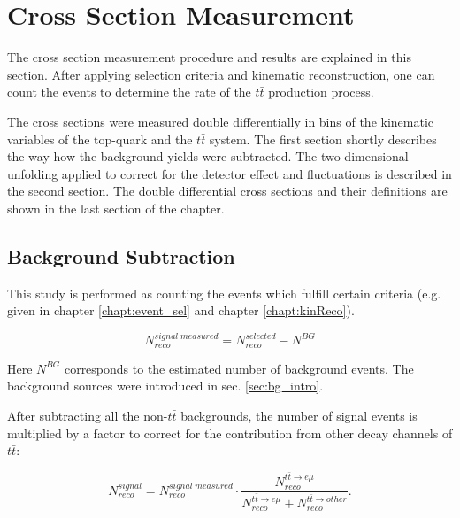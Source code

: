 \chapter{Cross Section Measurement}\label{chapt:xsec}

The cross section measurement procedure and results are explained in this section.
After applying selection criteria and kinematic reconstruction, one can count the events to determine
the rate of the $t\bar{t}$ production process.

The cross sections were measured double differentially in bins of the kinematic variables of the top-quark and the $t\bar{t}$ system.
The first section shortly describes the way how the background yields were subtracted.
The two dimensional unfolding applied to correct for the detector effect and fluctuations is described
in the second section.
The double differential cross sections and their definitions are shown in the last section of the chapter.

\section{Background Subtraction}
This study is performed as counting the events which fulfill certain criteria (e.g. given in chapter \ref{chapt:event_sel} and 
chapter \ref{chapt:kinReco}). 

\begin{equation}\label{eq:bgsub}
 N^{signal\;measured}_{reco} = N^{selected}_{reco} - N^{BG}
\end{equation}

Here $N^{BG}$ corresponds to the estimated number of background events. The background sources were introduced in sec. \ref{sec:bg_intro}.

After subtracting all the non-$t\bar{t}$ backgrounds, the number of signal events is multiplied by a factor to correct for the contribution
from other decay channels of $t\bar{t}$:

\begin{equation}\label{eq:bgsub}
 N^{signal}_{reco} = N^{signal\;measured}_{reco} \cdot \frac{N^{t\bar{t} \rightarrow e\mu}_{reco}}{N^{t\bar{t} \rightarrow e\mu}_{reco} + N^{t\bar{t} \rightarrow other}_{reco}}.
\end{equation}

